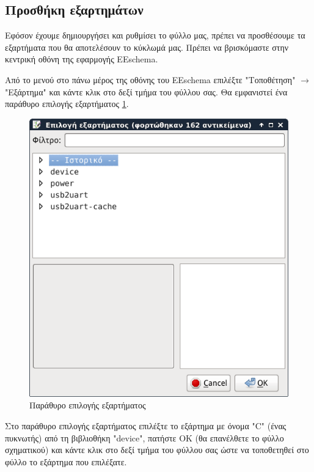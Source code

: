 \documentclass[a4paper]{article}
\begin{document}

\subsection{Προσθήκη εξαρτημάτων}
Εφόσον έχουμε δημιουργήσει και ρυθμίσει το φύλλο μας, πρέπει να προσθέσουμε τα εξαρτήματα που θα αποτελέσουν το κύκλωμά μας. Πρέπει να βρισκόμαστε στην κεντρική οθόνη της εφαρμογής \textenglish{EEschema}.

Από το μενού στο πάνω μέρος της οθόνης του \textenglish{EEschema} επιλέξτε "Τοποθέτηση" $\rightarrow$ "Εξάρτημα" και κάντε κλικ στο δεξί τμήμα του φύλλου σας. Θα εμφανιστεί ένα παράθυρο επιλογής εξαρτήματος \ref{fig:eesch-dial-addcomp}.

\begin{figure}
  \begin{center}
    \includegraphics[width=.9\textwidth]{img/eesch-dial-addcomp.png}
    \caption{Παράθυρο επιλογής εξαρτήματος}
    \label{fig:eesch-dial-addcomp}
  \end{center}
\end{figure}

Στο παράθυρο επιλογής εξαρτήματος επιλέξτε το εξάρτημα με όνομα "C" (ένας πυκνωτής) από τη βιβλιοθήκη "device", πατήστε ΟΚ (θα επανέλθετε το φύλλο σχηματικού) και κάντε κλικ στο δεξί τμήμα του φύλλου σας ώστε να τοποθετηθεί στο φύλλο το εξάρτημα που επιλέξατε. 
\end{document}
